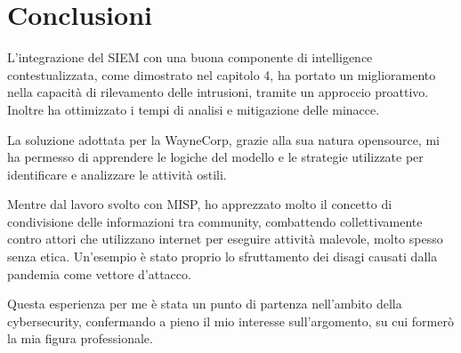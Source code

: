 \chapter{Conclusioni}
\label{chap:Conclusioni}

L'integrazione del SIEM con una buona componente di intelligence contestualizzata, come dimostrato nel capitolo 4, ha portato un miglioramento nella capacità di rilevamento delle intrusioni, tramite un approccio proattivo. Inoltre ha ottimizzato i tempi di analisi e mitigazione delle minacce.\par
La soluzione adottata per la WayneCorp, grazie alla sua natura opensource, mi ha permesso di apprendere le logiche del modello e le strategie utilizzate per identificare e analizzare le attività ostili.\par
Mentre dal lavoro svolto con MISP, ho apprezzato molto il concetto di condivisione delle informazioni tra community,
combattendo collettivamente contro attori che utilizzano internet per eseguire attività malevole, molto spesso senza etica. 
Un'esempio è stato proprio lo sfruttamento dei disagi causati dalla pandemia come vettore d'attacco.\par
Questa esperienza per me è stata un punto di partenza nell'ambito della cybersecurity, confermando a pieno il mio interesse sull'argomento, su cui formerò la mia figura professionale.
